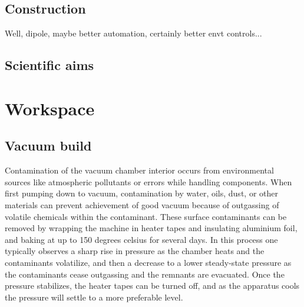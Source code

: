 \subsection*{Construction}

Well, dipole, maybe better automation, certainly better envt controls...
	
\subsection*{Scientific aims}

\section*{Workspace}
\subsection{Vacuum build}

	Contamination of the vacuum chamber interior occurs from environmental sources like atmospheric pollutants or errors while handling components.
	When first pumping down to vacuum, contamination by water, oils, dust, or other materials can prevent achievement of good vacuum because of outgassing of volatile chemicals within the contaminant.
	These surface contaminants can be removed by wrapping the machine in heater tapes and insulating aluminium foil, and baking at up to 150 degrees celsius for several days.
	In this process one typically observes a sharp rise in pressure as the chamber heats and the contaminants volatilize, and then a decrease to a lower steady-state pressure as the contaminants cease outgassing and the remnants are evacuated.
	Once the pressure stabilizes, the heater tapes can be turned off, and as the apparatus cools the pressure will settle to a more preferable level.


